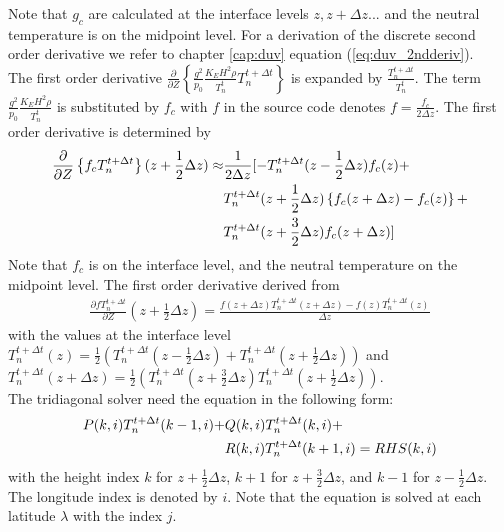 %
Note that $g_c$ are calculated at the interface levels $z, z+\Delta
z ...$ and the neutral temperature is on the midpoint level. For a
derivation of the discrete second order derivative we refer to
chapter \ref{cap:duv} equation (\ref{eq:duv_2ndderiv}). \\
%
The first order derivative $\frac{\partial}{\partial Z} \left\{
\frac{g^2}{p_0}\frac{K_E H^2 \rho}{T_n^t} T_n^{t+\Delta t} \right\}$
is expanded by $\frac{T_n^{t+\Delta t}}{T_n^t}$. The term
$\frac{g^2}{p_0}\frac{K_E H^2 \rho}{T_n^t}$ is substituted by $f_c$
with $f$ in the source code denotes $f= \frac{f_c}{2 \Delta z}$. The
first order derivative is determined by
%
\begin{align}
   \frac{\partial}{\partial Z} \left\{ f_c  T_n^{t+\Delta
    t} \right\}(z+\frac{1}{2}\Delta z) \approx &
    \frac{1}{2 \Delta z}
   [ -T_n^{t+\Delta t}(z - \frac{1}{2} \Delta z)f_c(z)+ \notag \\
  {} & T_n^{t+\Delta t}(z+ \frac{1}{2}\Delta z)\left\{ f_c(z+ \Delta z) -
     f_c(z) \right\} + \notag \\
   {} & T_n^{t+\Delta t}(z+\frac{3}{2}\Delta
z)f_c(z+\Delta z) ]
\end{align}
%
Note that $f_c$ is on the interface level, and the neutral
temperature on the midpoint level. The first order derivative
derived from
%
\begin{align}
 \frac{\partial f T_n^{t+\Delta t}}{\partial Z}(z+\frac{1}{2}\Delta z) =
 \frac{f(z+\Delta z)T_n^{t+\Delta t}(z+\Delta z) -
       f(z)T_n^{t+\Delta t}(z) }{\Delta z}
\end{align}
%
with the values at the interface level $T_n^{t+\Delta t}(z)=
\frac{1}{2} (T_n^{t+\Delta t}(z-\frac{1}{2}\Delta z)+ T_n^{t+\Delta
t}(z+\frac{1}{2}\Delta z))$ and $T_n^{t+\Delta t}(z+\Delta z)=
\frac{1}{2} (T_n^{t+\Delta t}(z+\frac{3}{2}\Delta
z)T_n^{t+\Delta t}(z+\frac{1}{2}\Delta z))$. \\
%
The tridiagonal solver need the equation in the following form:
%
\begin{align}
P(k,i) T_n^{t+\Delta t}(k-1,i) + & Q(k,i) T_n^{t+\Delta t}(k,i)+ \notag \\
 {} & R(k,i) T_n^{t+\Delta t}(k+1,i) = RHS(k,i)
\end{align}
%
with the height index $k$ for $z+\frac{1}{2}\Delta z$, $k+1$ for
$z+\frac{3}{2}\Delta z$, and $k-1$ for $z-\frac{1}{2}\Delta z$. The
longitude index is denoted by $i$. Note that the equation is solved
at each latitude $\lambda$ with the index $j$. \\
